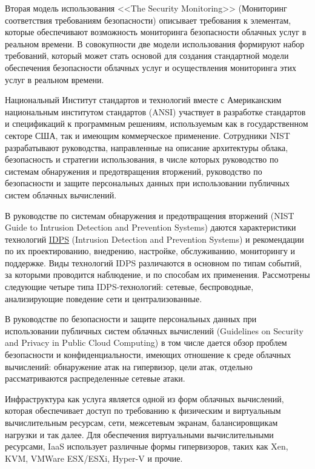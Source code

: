 Вторая модель использования <<The Security Monitoring>> (Мониторинг соответствия требованиям безопасности) описывает требования к элементам, которые обеспечивают возможность мониторинга безопасности облачных услуг в реальном времени.
В совокупности две модели использования формируют набор требований, который может стать основой для создания стандартной модели обеспечения безопасности облачных услуг и осуществления мониторинга этих услуг в реальном времени.

Национальный Институт стандартов и технологий вместе с Американским национальным институтом стандартов (ANSI) участвует в разработке стандартов и спецификаций к программным решениям, используемым как в государственном секторе США, так и имеющим коммерческое применение.
Сотрудники NIST разрабатывают руководства, направленные на описание архитектуры облака, безопасность и стратегии использования, в числе которых руководство по системам обнаружения и предотвращения вторжений, руководство по безопасности и защите персональных данных при использовании публичных систем облачных вычислений.

В руководстве по системам обнаружения и предотвращения вторжений (NIST Guide to Intrusion Detection and Prevention Systems) даются характеристики технологий \hyperlink{idps}{IDPS} (Intrusion Detection and Prevention Systems) и рекомендации по их проектированию, внедрению, настройке, обслуживанию, мониторингу и поддержке.
Виды технологий IDPS различаются в основном по типам событий, за которыми проводится наблюдение, и по способам их применения.
Рассмотрены следующие четыре типа IDPS-технологий: сетевые, беспроводные, анализирующие поведение сети и централизованные.

В руководстве по безопасности и защите персональных данных при использовании публичных систем облачных вычислений (Guidelines on Security and Privacy in Public Cloud Computing) в том числе дается обзор проблем безопасности и конфиденциальности, имеющих отношение к среде облачных вычислений: обнаружение атак на гипервизор, цели атак, отдельно рассматриваются распределенные сетевые атаки.

Инфраструктура как услуга является одной из форм облачных вычислений, которая обеспечивает доступ по требованию к физическим и виртуальным вычислительным ресурсам, сети, межсетевым экранам, балансировщикам нагрузки и так далее.
Для обеспечения виртуальными вычислительными ресурсами, IaaS использует различные формы гипервизоров, таких как Xen, KVM, VMWare ESX/ESXi, Hyper-V и прочие.

